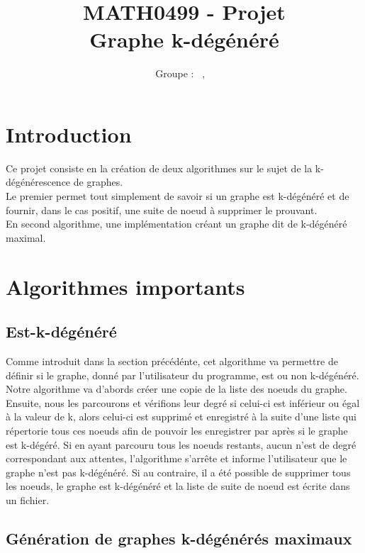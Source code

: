 \documentclass[a4paper, 11pt, oneside]{article}
\title{\textbf{MATH0499 - Projet}\\Graphe k-dégénéré}
\author{Groupe \GrNbr : \PrenomUN~\textsc{\NomUN}, \PrenomDEUX~\textsc{\NomDEUX}}
\date{}
\newcommand{\tablemat}{~}
\renewcommand{\tablemat}{\tableofcontents}
\begin{document}
\maketitle
\newpage
\tablemat
\newpage

\section{\textbf{Introduction}}
Ce projet consiste en la création de deux algorithmes sur le sujet de la k-dégénérescence de graphes.
\\Le premier permet tout simplement de savoir si un graphe est k-dégénéré et de fournir, 
dans le cas positif, une suite de noeud à supprimer le prouvant.
\\En second algorithme, une implémentation créant un graphe dit de k-dégénéré maximal.


\section{\textbf{Algorithmes importants}}

\subsection{Est-k-dégénéré}

Comme introduit dans la section précédénte, cet algorithme va permettre de définir si 
le graphe, donné par l'utilisateur du programme, est ou non k-dégénéré.
\\Notre algorithme va d'abords créer une copie de la liste des noeuds du graphe. Ensuite,
nous les parcourons et vérifions leur degré si celui-ci est inférieur ou égal à la 
valeur de k, alors celui-ci est supprimé et enregistré à la suite d'une liste qui 
répertorie tous ces noeuds afin de pouvoir les enregistrer par après si le graphe 
est k-dégéré. Si en ayant parcouru tous les noeuds restants, aucun n'est de degré 
correspondant aux attentes, l'algorithme s'arrête et informe l'utilisateur que le 
graphe n'est pas k-dégénéré.
Si au contraire, il a été possible de supprimer tous les noeuds, le graphe est k-dégénéré 
et la liste de suite de noeud est écrite dans un fichier.

\subsection{Génération de graphes k-dégénérés maximaux}
\end{document}
